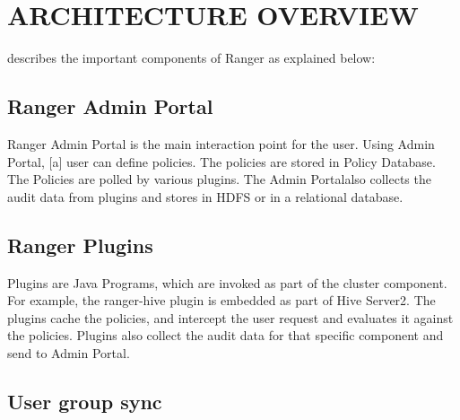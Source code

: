 \documentclass[9pt,twocolumn,twoside]{../../styles/osajnl}
\begin{document}
\section{ARCHITECTURE OVERVIEW}



\cite{www-ranger-architecture} describes the important components of
Ranger as explained below: \CE {}

\subsection{Ranger Admin Portal}

Ranger Admin Portal is the main interaction point for the user. Using Admin
Portal, [a] \GE user can define policies. The policies are stored in Policy Database\GE.
 The Policies are polled by various plugins. The Admin Portal\GE also collects
 the audit data from plugins and stores in HDFS or in a relational database.


\subsection{Ranger Plugins}

Plugins are Java Programs, which are invoked as part of the cluster component.
 For example, the ranger-hive plugin is embedded as part of Hive Server2. The
  plugins cache the policies, and intercept the user request and evaluates it
   against the policies. Plugins also collect the audit data for that
   specific component and send to Admin Portal\SE.


\subsection{User group sync}
\end{document}
